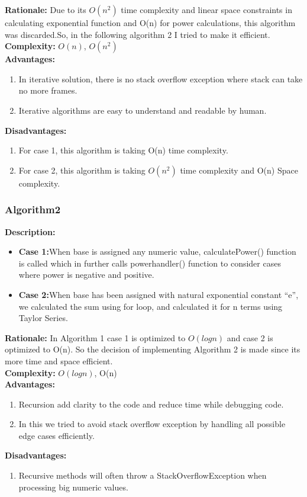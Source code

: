 \documentclass[a4paper,12pt]{report}
\begin{document}
\textbf{ Rationale: } Due to its $O(n^2)$ time complexity and linear space constraints in calculating exponential function and O(n) for power calculations, this algorithm was discarded.So, in the following algorithm 2 I tried to make it efficient.
\\\textbf{ Complexity: } $O(n)$, $O(n^2)$
\\\textbf{ Advantages: }
\begin{enumerate}
    \item In iterative solution, there is no stack overflow exception where stack can take no more frames.
    \item Iterative algorithms are easy to understand and readable by human.

\end{enumerate}
\textbf{ Disadvantages: }
\begin{enumerate}
    \item For case 1, this algorithm is taking O(n) time complexity.
    \item For case 2, this algorithm is taking $O(n^2)$ time complexity and O(n) Space complexity.

\end{enumerate}


\subsubsection{Algorithm2}

\textbf{ Description: }
\begin{itemize}
    \item \textbf{Case 1:}When base is assigned any numeric value, calculatePower() function is called which in further calls powerhandler() function to consider cases where power is negative and positive.
    \item \textbf{Case 2:}When base has been assigned with natural exponential constant “e”, we calculated the sum using for loop, and calculated it for n terms using Taylor Series.\cite{b6}
\end{itemize}
\textbf{ Rationale: } In Algorithm 1 case 1 is optimized to $O(log n)$ and case 2 is optimized to  O(n). So the decision of implementing Algorithm 2 is made since its more time and space efficient.
\\\textbf{ Complexity: } $O(log n)$, O(n)
\\\textbf{ Advantages: }
\begin{enumerate}
    \item Recursion add clarity to the code and reduce time while debugging code.
    \item In this we tried to avoid stack overflow exception by handling all possible edge cases efficiently.
\end{enumerate}
\textbf{ Disadvantages: }
\begin{enumerate}
    \item Recursive methods will often throw a StackOverflowException when processing big numeric values.

\end{enumerate}
\end{document}

